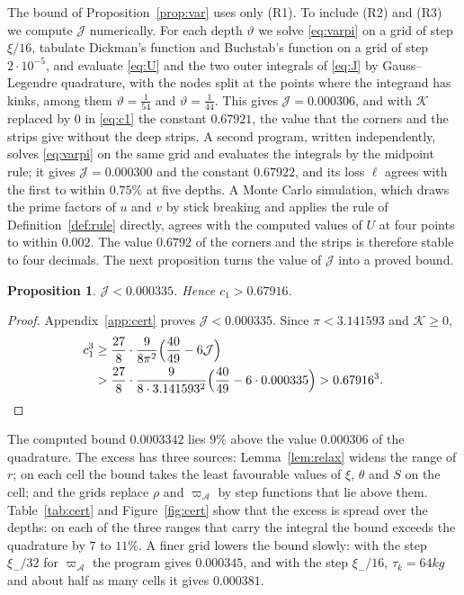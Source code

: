 \documentclass[aps,prd,twocolumn,superscriptaddress,nofootinbib,longbibliography,floatfix,showkeys,nobalancelastpage,amsmath,amssymb,10pt]{revtex4-2}
\theoremstyle{plain}
\newtheorem{proposition}[theorem]{Proposition}
\theoremstyle{definition}
\theoremstyle{plain}
\newcommand{\Jc}{\mathcal{J}}
\newcommand{\Kc}{\mathcal{K}}
\begin{document}
The bound of Proposition~\ref{prop:var} uses only (R1). To include (R2) and (R3) we compute $\Jc$ numerically. For each depth $\vartheta$ we solve \eqref{eq:varpi} on a grid of step $\xi/16$, tabulate Dickman's function and Buchstab's function on a grid of step $2\cdot10^{-5}$, and evaluate \eqref{eq:U} and the two outer integrals of \eqref{eq:J} by Gauss--Legendre quadrature, with the nodes split at the points where the integrand has kinks, among them $\vartheta=\frac1{54}$ and $\vartheta=\frac1{44}$. This gives $\Jc=0.000306$, and with $\Kc$ replaced by $0$ in \eqref{eq:c1} the constant $0.67921$, the value that the corners and the strips give without the deep strips. A second program, written independently, solves \eqref{eq:varpi} on the same grid and evaluates the integrals by the midpoint rule; it gives $\Jc=0.000300$ and the constant $0.67922$, and its loss $\ell$ agrees with the first to within $0.75\%$ at five depths. A Monte Carlo simulation, which draws the prime factors of $u$ and $v$ by stick breaking and applies the rule of Definition~\ref{def:rule} directly, agrees with the computed values of $U$ at four points to within $0.002$. The value $0.6792$ of the corners and the strips is therefore stable to four decimals. The next proposition turns the value of $\Jc$ into a proved bound.

\begin{proposition}\label{prop:cert}
$\Jc<0.000335$. Hence $c_1>0.67916$.
\end{proposition}

\begin{proof}
Appendix~\ref{app:cert} proves $\Jc<0.000335$. Since $\pi<3.141593$ and $\Kc\ge0$,
\begin{align*}
c_1^3&\ge\frac{27}8\cdot\frac9{8\pi^2}\Bigl(\frac{40}{49}-6\Jc\Bigr)\\
&>\frac{27}8\cdot\frac9{8\cdot3.141593^2}\Bigl(\frac{40}{49}-6\cdot0.000335\Bigr)>0.67916^3.\qedhere
\end{align*}
\end{proof}

The computed bound $0.0003342$ lies $9\%$ above the value $0.000306$ of the quadrature. The excess has three sources: Lemma~\ref{lem:relax} widens the range of $r$; on each cell the bound takes the least favourable values of $\xi$, $\theta$ and $S$ on the cell; and the grids replace $\rho$ and $\varpi_{\mathcal A}$ by step functions that lie above them. Table~\ref{tab:cert} and Figure~\ref{fig:cert} show that the excess is spread over the depths: on each of the three ranges that carry the integral the bound exceeds the quadrature by $7$ to $11\%$. A finer grid lowers the bound slowly: with the step $\xi_-/32$ for $\varpi_{\mathcal A}$ the program gives $0.000345$, and with the step $\xi_-/16$, $\tau_k=64kg$ and about half as many cells it gives $0.000381$.
\end{document}
